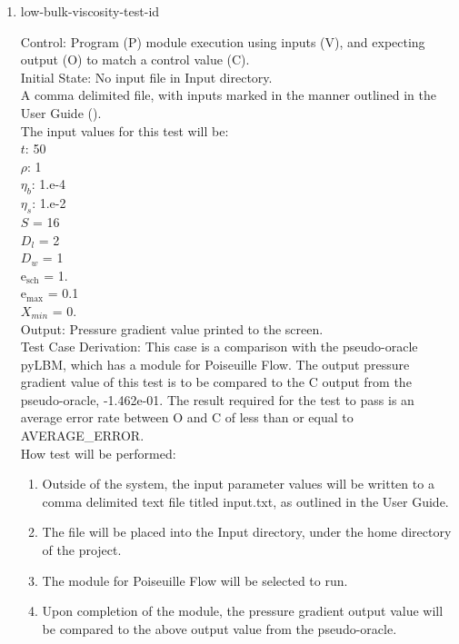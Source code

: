 \documentclass[12pt, titlepage]{article}
\newcounter{testcounter} %
\begin{document}
\begin{enumerate}
\item{low-bulk-viscosity-test-id\thetestcounter \\}

Control: Program (P) module execution using inputs (V), and expecting output (O) to match a control value (C).\\
					
Initial State: No input file in Input directory.\\
					
A comma delimited file, with inputs marked in the manner outlined in the User
Guide (\citet{LBM_UserGuide_PM}).\\The input values for this test will be:\\
$t$: 50\\
$\rho$: 1\\
$\eta_b$: 1.e-4\\
$\eta_s$: 1.e-2\\
$S$ = 16\\
$D_{l}$ = 2\\
$D_{w}$ = 1\\
$\mathrm{e_{sch}}$ = 1.\\
$\mathrm{e_{max}}$ = 0.1\\
$X_{min}$ = 0.\\

Output: Pressure gradient value printed to the screen. \\ 

Test Case Derivation: This case is a comparison with the pseudo-oracle pyLBM,
which has a module for Poiseuille Flow. The output pressure gradient value of
this test is to be compared to the C output from the pseudo-oracle,
-1.462e-01. The result required for the test to pass is an average error rate
between O and C of less than or equal to AVERAGE\_ERROR.\\

How test will be performed: 

\begin{enumerate}
\item Outside of the system, the input parameter values will be written to a
comma delimited text file titled input.txt, as outlined in the User Guide.
\item The file will be placed into the Input directory, under the home directory
of the project.
\item The module for Poiseuille Flow will be selected to run.
\item Upon completion of the module, the pressure gradient output value will be
compared to the above output value from the pseudo-oracle.
\end{enumerate}	


\end{enumerate}
\end{document}

